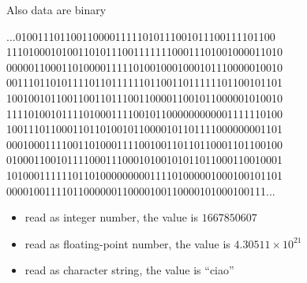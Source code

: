 \begin{frame}[fragile]{Also data are binary}

  \begin{semiverbatim}
{\color{gray}...01001110110011000011111010111001011100111101100
11101000101001101011100111111100011101001000011010
00000110001101000011111010010001000101110000010010
00111011010111101101111110110011011111101100101101
10010010110011001101110011000011001011000001010010
11110100101111010001111001011000000000001111110100
10011101100011011010010110000101101111000000001101
00010001111001101000111100100110110110001101100100
01000110010111100011100010100101011011000110010001
10100011111101101000000000111101000001000100101101
00001001111011000000110000100110000101000100111...}\end{semiverbatim}


\begin{itemize}
\item<3-> read as \alert<3>{integer number}, the value is $1667850607$
\item<4-> read as \alert<4>{floating-point number}, the value is $4.30511 \times 10^{21}$
\item<5-> read as \alert<5>{character string}, the value is ``ciao''
\end{itemize}
\end{frame}
